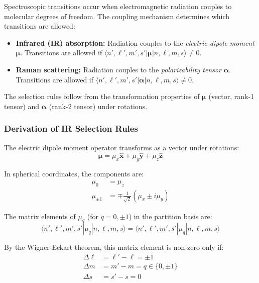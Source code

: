 \documentclass[twocolumn,10pt]{article}
\theoremstyle{remark}
\begin{document}
Spectroscopic transitions occur when electromagnetic radiation couples to molecular degrees of freedom. The coupling mechanism determines which transitions are allowed:

\begin{itemize}
    \item \textbf{Infrared (IR) absorption:} Radiation couples to the \textit{electric dipole moment} $\boldsymbol{\mu}$. Transitions are allowed if $\langle n', \ell', m', s' | \boldsymbol{\mu} | n, \ell, m, s \rangle \neq 0$.
    
    \item \textbf{Raman scattering:} Radiation couples to the \textit{polarizability tensor} $\boldsymbol{\alpha}$. Transitions are allowed if $\langle n', \ell', m', s' | \boldsymbol{\alpha} | n, \ell, m, s \rangle \neq 0$.
\end{itemize}

The selection rules follow from the transformation properties of $\boldsymbol{\mu}$ (vector, rank-1 tensor) and $\boldsymbol{\alpha}$ (rank-2 tensor) under rotations.

\subsubsection{Derivation of IR Selection Rules}

The electric dipole moment operator transforms as a vector under rotations:
\begin{equation}
    \boldsymbol{\mu} = \mu_x \hat{\mathbf{x}} + \mu_y \hat{\mathbf{y}} + \mu_z \hat{\mathbf{z}}
    \label{eq:dipole_operator}
\end{equation}

In spherical coordinates, the components are:
\begin{align}
    \mu_0 &= \mu_z \label{eq:dipole_z} \\
    \mu_{\pm 1} &= \mp \frac{1}{\sqrt{2}}(\mu_x \pm i\mu_y) \label{eq:dipole_pm}
\end{align}

The matrix elements of $\mu_q$ (for $q = 0, \pm 1$) in the partition basis are:
\begin{equation}
    \langle n', \ell', m', s' | \mu_q | n, \ell, m, s \rangle = \langle n', \ell', m', s' | \mu_q | n, \ell, m, s \rangle
    \label{eq:dipole_matrix_element}
\end{equation}

By the Wigner-Eckart theorem, this matrix element is non-zero only if:
\begin{align}
    \Delta \ell &= \ell' - \ell = \pm 1 \label{eq:IR_selection_l} \\
    \Delta m &= m' - m = q \in \{0, \pm 1\} \label{eq:IR_selection_m} \\
    \Delta s &= s' - s = 0 \label{eq:IR_selection_s}
\end{align}
\end{document}
